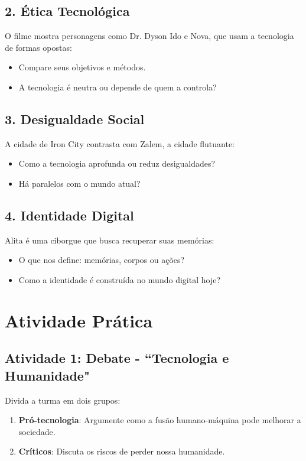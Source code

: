 \documentclass[12pt]{article}
\begin{document}
\begin{multicols}{2}
\subsection*{2. Ética Tecnológica}
O filme mostra personagens como Dr. Dyson Ido e Nova, que usam a tecnologia de formas opostas:
\begin{itemize}
    \item Compare seus objetivos e métodos.
    \item A tecnologia é neutra ou depende de quem a controla?
\end{itemize}


\subsection*{3. Desigualdade Social}
A cidade de Iron City contrasta com Zalem, a cidade flutuante:
\begin{itemize}
    \item Como a tecnologia aprofunda ou reduz desigualdades?
    \item Há paralelos com o mundo atual?
\end{itemize}

\subsection*{4. Identidade Digital}
Alita é uma ciborgue que busca recuperar suas memórias:
\begin{itemize}
    \item O que nos define: memórias, corpos ou ações?
    \item Como a identidade é construída no mundo digital hoje?
\end{itemize}

\section*{Atividade Prática}

\subsection*{Atividade 1: Debate - ``Tecnologia e Humanidade"}
Divida a turma em dois grupos:
\begin{enumerate}
    \item \textbf{Pró-tecnologia}: Argumente como a fusão humano-máquina pode melhorar a sociedade.
    \item \textbf{Críticos}: Discuta os riscos de perder nossa humanidade.
\end{enumerate}


\end{multicols}
\end{document}
